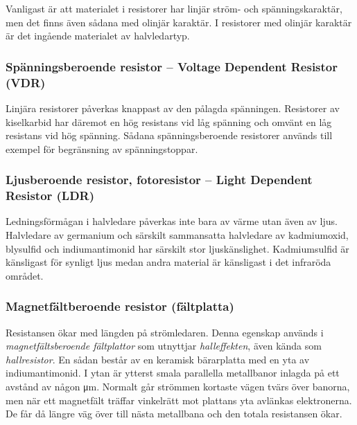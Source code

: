Vanligast är att materialet i resistorer har linjär ström- och
spänningskaraktär, men det finns även sådana med olinjär karaktär.
I resistorer med olinjär karaktär är det ingående materialet av halvledartyp.

\subsubsection{Spänningsberoende resistor -- Voltage Dependent Resistor (VDR)}

Linjära resistorer påverkas knappast av den pålagda spänningen.
Resistorer av kiselkarbid har däremot en hög resistans vid låg spänning och
omvänt en låg resistans vid hög spänning.
Sådana spänningsberoende resistorer används till exempel för begränsning av
spänningstoppar.

\subsubsection{Ljusberoende resistor, fotoresistor -- Light Dependent Resistor (LDR)}

Ledningsförmågan i halvledare påverkas inte bara av värme utan även av ljus.
Halvledare av germanium och särskilt sammansatta halvledare av kadmiumoxid,
blysulfid och indiumantimonid har särskilt stor ljuskänslighet. Kadmiumsulfid
är känsligast för synligt ljus medan andra material är känsligast i det
infraröda området.

\subsubsection{Magnetfältberoende resistor (fältplatta)}

Resistansen ökar med längden på strömledaren. Denna egenskap används i
\emph{magnetfältsberoende fältplattor} som utnyttjar \emph{halleffekten}, även
kända som \emph{hallresistor}. En sådan består av en keramisk bärarplatta med
en yta av indiumantimonid.
I ytan är ytterst smala parallella metallbanor inlagda på ett avstånd av någon
\unit{\micro\metre}.
Normalt går strömmen kortaste vägen tvärs över banorna, men när ett magnetfält
träffar vinkelrätt mot plattans yta avlänkas elektronerna.
De får då längre väg över till nästa metallbana och den totala resistansen
ökar.

